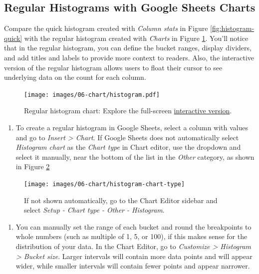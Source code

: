 \documentclass[
  english,
]{book}
\providecommand{\tightlist}{%
  \setlength{\itemsep}{0pt}\setlength{\parskip}{0pt}}
\begin{document}
\hypertarget{regular-histograms-with-google-sheets-charts}{%
\subsection*{Regular Histograms with Google Sheets Charts}\label{regular-histograms-with-google-sheets-charts}}

Compare the quick histogram created with \emph{Column stats} in Figure \ref{fig:histogram-quick} with the regular histogram created with \emph{Charts} in Figure \ref{fig:histogram}. You'll notice that in the regular histogram, you can define the bucket ranges, display dividers, and add titles and labels to provide more context to readers. Also, the interactive version of the regular histogram allows users to float their cursor to see underlying data on the count for each column.



\begin{figure}
\centering
\texttt{[image: images/06-chart/histogram.pdf]}
\caption{\label{fig:histogram}Regular histogram chart: Explore the full-screen \href{https://docs.google.com/spreadsheets/d/e/2PACX-1vRyg09UZgGWVHPk3oOKAZ-zlqtDF_RpvOLdAsM-k-ZW5NavcxAyHbErgr-7dt7U_AFSVZONSTZ9sVII/pubchart?oid=480820223\&format=interactive}{interactive version}.}
\end{figure}

\begin{enumerate}
\def\labelenumi{\arabic{enumi}.}
\tightlist
\item
  To create a regular histogram in Google Sheets, select a column with values and go to \emph{Insert \textgreater{} Chart}. If Google Sheets does not automatically select \emph{Histogram chart} as the \emph{Chart type} in Chart editor, use the dropdown and select it manually, near the bottom of the list in the \emph{Other} category, as shown in Figure \ref{fig:histogram-chart-type}
\end{enumerate}



\begin{figure}
\texttt{[image: images/06-chart/histogram-chart-type]} \caption{If not shown automatically, go to the Chart Editor sidebar and select \emph{Setup - Chart type - Other - Histogram}.}\label{fig:histogram-chart-type}
\end{figure}

\begin{enumerate}
\def\labelenumi{\arabic{enumi}.}
\setcounter{enumi}{1}
\tightlist
\item
  You can manually set the range of each bucket and round the breakpoints to whole numbers (such as multiple of 1, 5, or 100), if this makes sense for the distribution of your data. In the Chart Editor, go to \emph{Customize \textgreater{} Histogram \textgreater{} Bucket size}. Larger intervals will contain more data points and will appear wider, while smaller intervals will contain fewer points and appear narrower.
\end{enumerate}
\end{document}
